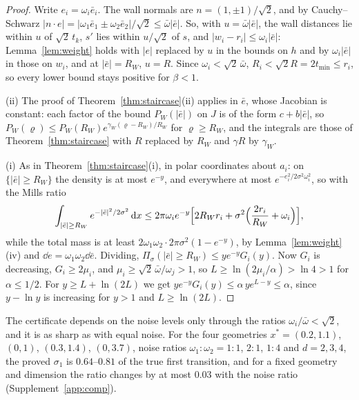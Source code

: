 \begin{proof}
Write $e_i = \omega_i\bar e_i$. The wall normals are $n = (1, \pm1)/\sqrt2$, and by Cauchy--Schwarz
$|n\cdot e| = |\omega_1\bar e_1 \pm \omega_2\bar e_2|/\sqrt2 \le \bar\omega|\bar e|$. So, with $u = \bar\omega|\bar e|$, the
wall distances lie within $u$ of $\sqrt2\,t_k$, $s'$ lies within $u/\sqrt2$ of $s$, and $|w_i - r_i| \le \omega_i|\bar e|$:
Lemma~\ref{lem:weight} holds with $|e|$ replaced by $u$ in the bounds on $h$ and by $\omega_i|\bar e|$ in those on $w_i$, and
at $|\bar e| = R_W$, $u = R$. Since $\omega_i < \sqrt2\,\bar\omega$, $R_i < \sqrt2 R = 2t_{\min} \le r_i$, so every lower bound
stays positive for $\beta < 1$.

(ii) The proof of Theorem~\ref{thm:staircase}(ii) applies in $\bar e$, whose Jacobian is constant: each factor of the
bound $P_W(|\bar e|)$ on $J$ is of the form $c + b|\bar e|$, so
$P_W(\varrho) \le P_W(R_W)e^{\gamma_W(\varrho - R_W)/R_W}$ for $\varrho \ge R_W$, and the integrals are those of
Theorem~\ref{thm:staircase} with $R$ replaced by $R_W$ and $\gamma R$ by $\gamma_W$.

(i) As in Theorem~\ref{thm:staircase}(i), in polar coordinates about $a_i$: on $\{|\bar e| \ge R_W\}$ the density is at
most $e^{-y}$, and everywhere at most $e^{-e_i^2/2\sigma^2\omega_i^2}$, so with the Mills ratio
\[ \int_{|\bar e| \ge R_W} e^{-|\bar e|^2/2\sigma^2}\,\mathrm{d} x \le 2\pi \omega_i e^{-y}\Bigl[2R_Wr_i + \sigma^2\Bigl(\frac{2r_i}{R_W} + \omega_i\Bigr)\Bigr], \]
while the total mass is at least $2\omega_1\omega_2\cdot 2\pi\sigma^2(1 - e^{-y})$, by Lemma~\ref{lem:weight}(iv) and
$\dd e = \omega_1\omega_2\dd\bar e$. Dividing, $\Pi_\sigma(|\bar e| \ge R_W) \le ye^{-y}G_i(y)$. Now $G_i$ is decreasing,
$G_i \ge 2\mu_i$, and $\mu_i \ge \sqrt2\,\bar\omega/\omega_j > 1$, so $L \ge \ln(2\mu_i/\alpha) > \ln 4 > 1$ for $\alpha \le 1/2$.
For $y \ge L + \ln(2L)$ we get $ye^{-y}G_i(y) \le \alpha\,ye^{L - y} \le \alpha$, since $y - \ln y$ is increasing for
$y > 1$ and $L \ge \ln(2L)$.
\end{proof}

The certificate depends on the noise levels only through the ratios $\omega_i/\bar\omega < \sqrt2$, and it is as sharp as with
equal noise. For the four geometries $x^* = (0.2, 1.1)$, $(0, 1)$, $(0.3, 1.4)$, $(0, 3.7)$, noise ratios
$\omega_1 : \omega_2 = 1 : 1$, $2 : 1$, $1 : 4$ and $d = 2, 3, 4$, the proved $\sigma_1$ is $0.64$--$0.81$ of the true first
transition, and for a fixed geometry and dimension the ratio changes by at most $0.03$ with the noise ratio
(Supplement~\ref{app:comp}).

